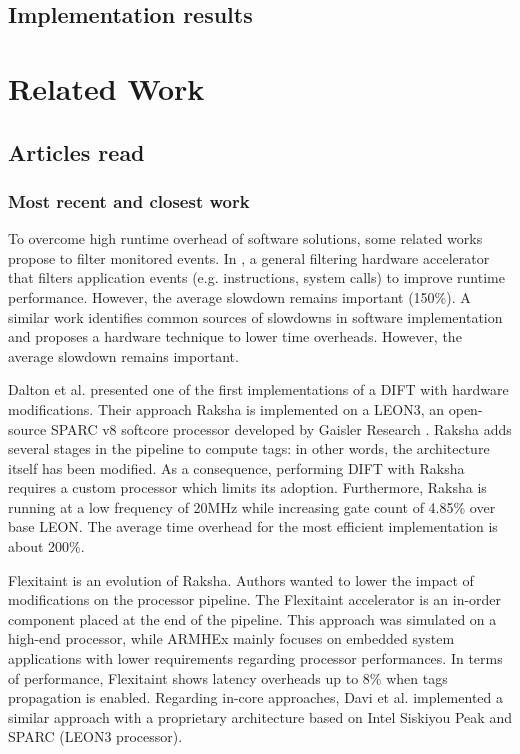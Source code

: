 \documentclass[10pt,a4paper, oneside]{memoir}
\begin{document}
\section{Implementation results}

\chapter{Related Work}
\section{Articles read}

\subsection{Most recent and closest work}
To overcome high runtime overhead of software solutions, some related works propose to filter monitored events. In \cite{Fytraki2014}, a general filtering hardware accelerator that filters application events (e.g. instructions, system calls) to improve runtime performance. However, the average slowdown remains important (150\%). A similar work \cite{Chen2009} identifies common sources of slowdowns in software implementation and proposes a hardware technique to lower time overheads. However, the average slowdown remains important.

Dalton et al. \cite{Dalton07} presented one of the first implementations of a DIFT with hardware modifications. Their approach Raksha is implemented on a LEON3, an open-source SPARC v8 softcore processor developed by Gaisler Research \cite{Gaisler10}. Raksha adds several stages in the pipeline to compute tags: in other words, the architecture itself has been modified. As a consequence, performing DIFT with Raksha requires a custom processor which limits its adoption. Furthermore, Raksha is running at a low frequency of 20MHz while increasing gate count of 4.85\% over base LEON. The average time overhead for the most efficient implementation is about 200\%.

Flexitaint \cite{Venkataramani08} is an evolution of Raksha. Authors wanted to lower the impact of modifications on the processor pipeline. The Flexitaint accelerator is an in-order component placed at the end of the pipeline. This approach was simulated on a high-end processor, while ARMHEx mainly focuses on embedded system applications with lower requirements regarding processor performances. In terms of performance, Flexitaint shows latency overheads up to 8\% when tags propagation is enabled. Regarding in-core approaches, Davi et al. \cite{Davi15} implemented a similar approach with a proprietary architecture based on Intel Siskiyou Peak and SPARC (LEON3 processor).
\end{document}

